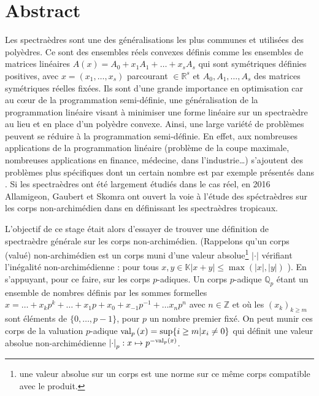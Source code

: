\section*{Abstract}

	Les spectraèdres sont une des généralisations les plus communes et utilisées des polyèdres. Ce sont des ensembles réels convexes définis comme les ensembles de matrices linéaires $A(x) = A_0 + x_1 A_1 + \ldots + x_s A_s$ qui sont symétriques définies positives, avec $x = \left( x_1,\ldots,x_s \right)$ parcourant $\in \mathbb{R}^s $ et $A_0,A_1,\ldots,A_s$ des matrices symétriques réelles fixées.
Ils sont d'une grande importance en optimisation car au cœur de la programmation semi-définie, une généralisation de la programmation linéaire visant à minimiser une forme linéaire sur un spectraèdre au lieu et en place d'un polyèdre convexe. Ainsi, une large variété de problèmes peuvent se réduire à la programmation semi-définie. En effet, aux nombreuses applications de la programmation linéaire (problème de la coupe maximale, nombreuses applications en finance, médecine, dans l'industrie\ldots) s'ajoutent des problèmes plus spécifiques dont un certain nombre est par exemple présentés dans \cite{vandenberghe_applications_1999}. Si les spectraèdres ont été largement étudiés dans le cas réel, en 2016  Allamigeon, Gaubert et Skomra ont ouvert la voie à l'étude des spéctraèdres sur les corps non-archimédien dans \cite{allamigeon_tropical_2020} en définissant les spectraèdres tropicaux.

L'objectif de ce stage était alors d'essayer de trouver une définition de spectraèdre générale sur les corps non-archimédien. (Rappelons qu'un corps (valué) non-archimédien est un corps muni d'une valeur absolue\footnote{une valeur absolue sur un corps est une norme sur ce même corps compatible avec le produit.} $\left| \cdot  \right|$ vérifiant l'inégalité non-archimédienne : pour tous $ x,y \in \mathbb{K}  \left| x+y \right|\le \max\left( \left| x \right|, \left| y \right|\right)$ ). En s'appuyant, pour ce faire, sur les corps $p$-adiques. Un corps $p$-adique $\mathbb{Q}_{p}$ étant un ensemble de nombres définis par les sommes formelles $x = \ldots + x_k p^k + \ldots + x_1 p + x_0 +x_{-1} p^{-1} + \ldots x_{n}p^n$ avec $n \in \mathbb{Z}$ et où les $(x_k)_{k\ge m}$ sont éléments de $\{0,\ldots,p-1\} $, pour $p$ un nombre premier fixé. On peut munir ces corps de la valuation $p$-adique $\text{val}_p\left(x\right) = \sup \{i \ge m | x_{i}\neq 0\} $ qui définit une valeur absolue non-archimédienne $\left| \cdot  \right|_p : x\mapsto p^{-\text{val}_p\left(x\right)} $. 

